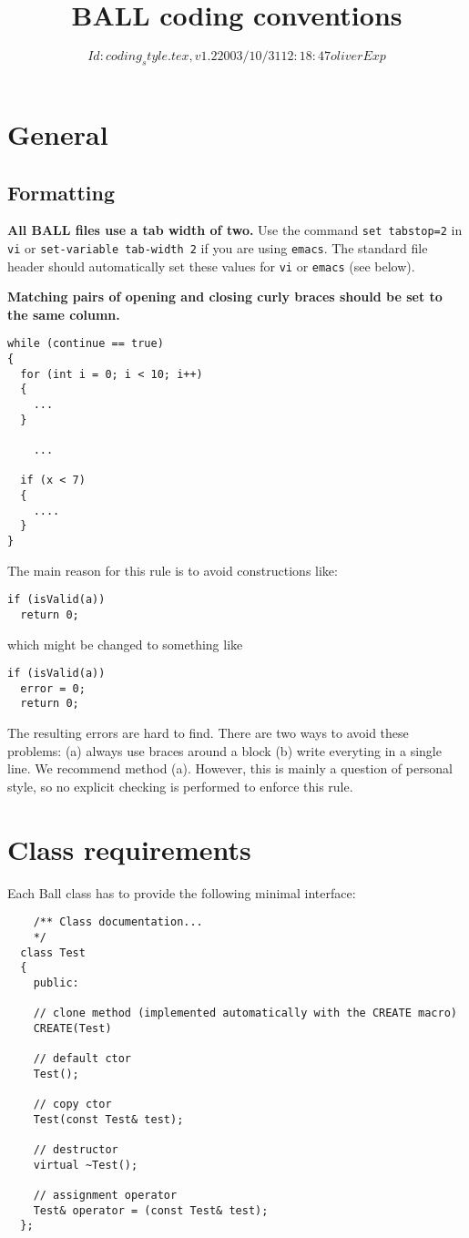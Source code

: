 \documentclass[a4]{article}
\title{BALL coding conventions}
\author{}
\date{$Id: coding_style.tex,v 1.2 2003/10/31 12:18:47 oliver Exp $}
\begin{document}
\maketitle


\section{General}

\subsection{Formatting}

{\bf All BALL files use a tab width of two.} Use the command {\tt set tabstop=2} in
{\tt vi} or {\tt set-variable tab-width 2} if you are using {\tt emacs}. The
standard file header should automatically set these values for {\tt vi} or
{\tt emacs} (see below).

\noindent
{\bf Matching pairs of opening and closing curly braces should be set to the same
column.}

\begin{verbatim}
while (continue == true)
{
  for (int i = 0; i < 10; i++)
  {
    ...
  }

 	...

  if (x < 7)
  {
    ....
  }
}
\end{verbatim}
The main reason for this rule is to avoid constructions like:

\begin{verbatim}
if (isValid(a))
  return 0;
\end{verbatim}

which might be changed to something like

\begin{verbatim}
if (isValid(a))
  error = 0;
  return 0;
\end{verbatim}

The resulting errors are hard to find. There are two ways to avoid these
problems: (a) always use braces around a block (b) write everyting in a single
line. We recommend method (a).
However, this is mainly a question of personal style, so no explicit checking
is performed to enforce this rule.



\section{Class requirements}

Each Ball class has to provide the following minimal interface:
\begin{verbatim}
	/** Class documentation... 
	*/
  class Test
  {
    public:

    // clone method (implemented automatically with the CREATE macro)
    CREATE(Test)    

    // default ctor
    Test();

    // copy ctor 
    Test(const Test& test);

    // destructor 
    virtual ~Test();
 
    // assignment operator
    Test& operator = (const Test& test);
  };
\end{verbatim}
\end{document}
